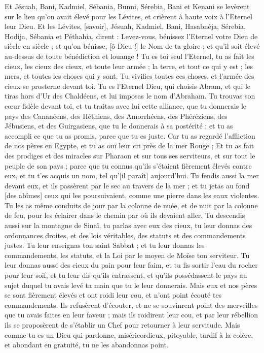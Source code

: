 \begin{multicols}{2}
{Et Jésuah, Bani, Kadmiel, Sébania, Bunni, Sérebia, Bani et Kenani se levèrent sur le lieu qu'on avait élevé pour les Lévites, et crièrent à haute voix à l'Eternel leur Dieu.
Et les Lévites, [savoir], Jésuah, Kadmiel, Bani, Hasabnéja, Sérebia, Hodija, Sébania et Péthahia, dirent : Levez-vous, bénissez l'Eternel votre Dieu de siècle en siècle ; et qu'on bénisse, [ô Dieu !] le Nom de ta gloire ; et qu'il soit élevé au-dessus de toute bénédiction et louange !
Tu es toi seul l'Eternel, tu as fait les cieux, les cieux des cieux, et toute leur armée ; la terre, et tout ce qui y est ; les mers, et toutes les choses qui y sont. Tu vivifies toutes ces choses, et l'armée des cieux se prosterne devant toi.
Tu es l'Eternel Dieu, qui choisis Abram, et qui le tiras hors d'Ur des Chaldéens, et lui imposas le nom d'Abraham.
Tu trouvas son cœur fidèle devant toi, et tu traitas avec lui cette alliance, que tu donnerais le pays des Cananéens, des Héthiens, des Amorrhéens, des Phéréziens, des Jébusiens, et des Guirgasiens, que tu le donnerais à sa postérité ; et tu as accompli ce que tu as promis, parce que tu es juste.
Car tu as regardé l'affliction de nos pères en Egypte, et tu as ouï leur cri près de la mer Rouge ;
Et tu as fait des prodiges et des miracles sur Pharaon et sur tous ses serviteurs, et sur tout le peuple de son pays ; parce que tu connus qu'ils s'étaient fièrement élevés contre eux, et tu t'es acquis un nom, tel qu'[il paraît] aujourd'hui.
Tu fendis aussi la mer devant eux, et ils passèrent par le sec au travers de la mer ; et tu jetas au fond [des abîmes] ceux qui les poursuivaient, comme une pierre dans les eaux violentes.
Tu les as même conduits de jour par la colonne de nuée, et de nuit par la colonne de feu, pour les éclairer dans le chemin par où ils devaient aller.
Tu descendis aussi sur la montagne de Sinaï, tu parlas avec eux des cieux, tu leur donnas des ordonnances droites, et des lois véritables, des statuts et des commandements justes.
Tu leur enseignas ton saint Sabbat ; et tu leur donnas les commandements, les statuts, et la Loi par le moyen de Moïse ton serviteur.
Tu leur donnas aussi des cieux du pain pour leur faim, et tu fis sortir l'eau du rocher pour leur soif, et tu leur dis qu'ils entrassent, et qu'ils possédassent le pays au sujet duquel tu avais levé ta main que tu le leur donnerais.
Mais eux et nos pères se sont fièrement élevés et ont roidi leur cou, et n'ont point écouté tes commandements.
Ils refusèrent d'écouter, et ne se souvinrent point des merveilles que tu avais faites en leur faveur ; mais ils roidirent leur cou, et par leur rébellion ils se proposèrent de s'établir un Chef pour retourner à leur servitude. Mais comme tu es un Dieu qui pardonne, miséricordieux, pitoyable, tardif à la colère, et abondant en gratuité, tu ne les abandonnas point.
}
\end{multicols}
